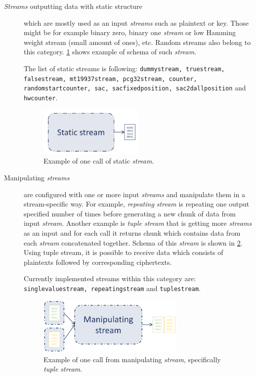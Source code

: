 \documentclass[
    digital,    %
    oneside,    %
    color,
    11pt,
    nocover,
    notable,
    nolof,
    nolot,
    final
]{fithesis3}
\renewcommand\_{\textunderscore\allowbreak}
\begin{document}
\begin{description}
	\item[\textit{Streams} outputting data with static structure] which are mostly used as an input \textit{streams} such as plaintext or key. Those might be for example binary zero, binary one \textit{stream} or low Hamming weight stream (small amount of ones), etc. Random streams also belong to this category. \cref{fig:static-stream} shows example of schema of such \textit{stream}.
	
	The list of static streams is following:  \texttt{dummy\_stream, true\_stream, false\_stream, mt19937\_stream, pcg32\_stream, counter, random\_start\_counter, sac, sac\_fixed\_position, sac\_2d\_all\_position} and \texttt{hw\_counter}. 

	
	\begin{figure}[h]
		\centering
		\includegraphics[width=0.5\textwidth]{./images/pictures/static-stream.png}
		\caption{Example of one call of static \textit{stream}.}
		\label{fig:static-stream}
	\end{figure}

	\item[Manipulating \textit{streams}] are configured with one or more input \textit{streams} and manipulate them in a stream-specific way. For example, \textit{repeating stream} is repeating one output specified number of times before generating a new chunk of data from input \textit{stream}. Another example is \textit{tuple stream} that is getting more \textit{streams} as an input and for each call it returns chunk which contains data from each \textit{stream} concatenated together. Schema of this \textit{stream} is shown in \cref{fig:manipulating-stream}. Using tuple stream, it is possible to receive data which consists of plaintexts followed by corresponding ciphertexts.
	
	Currently implemented streams within this category are: \texttt{ single\_value\_stream, repeating\_stream} and \texttt{tuple\_stream}.
	
	\begin{figure}[h]
		\centering
		\includegraphics[width=0.7\textwidth]{./images/pictures/manipulating-stream.png}
		\caption{Example of one call from manipulating \textit{stream}, specifically \textit{tuple stream}. }
		\label{fig:manipulating-stream}
	\end{figure}
	

\end{description}
\end{document}
